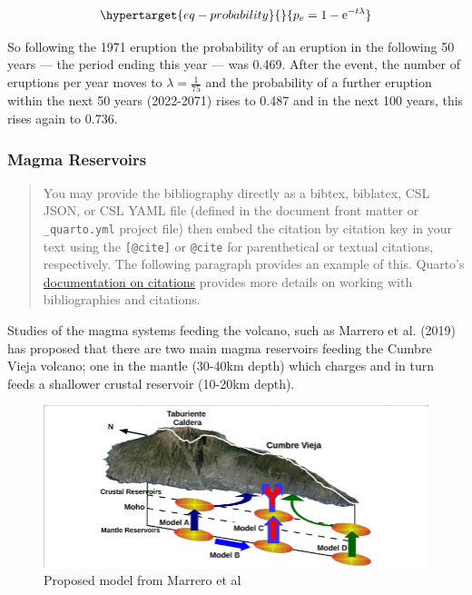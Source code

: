 \documentclass[
]{agujournal2019}
\begin{document}
\begin{equation}\protect\hypertarget{eq-probability}{}{
p_e = 1-\mathrm{e}^{-t \lambda}
}\label{eq-probability}\end{equation}

So following the 1971 eruption the probability of an eruption in the
following 50 years --- the period ending this year --- was 0.469. After
the event, the number of eruptions per year moves to
\(\lambda=\frac{1}{75}\) and the probability of a further eruption
within the next 50 years (2022-2071) rises to 0.487 and in the next 100
years, this rises again to 0.736.

\hypertarget{magma-reservoirs}{%
\subsubsection{Magma Reservoirs}\label{magma-reservoirs}}

\begin{quote}
You may provide the bibliography directly as a bibtex, biblatex, CSL
JSON, or CSL YAML file (defined in the document front matter or
\texttt{\_quarto.yml} project file) then embed the citation by citation
key in your text using the \texttt{{[}@cite{]}} or \texttt{@cite} for
parenthetical or textual citations, respectively. The following
paragraph provides an example of this. Quarto's
\href{https://quarto.org/docs/authoring/footnotes-and-citations.html}{documentation
on citations} provides more details on working with bibliographies and
citations.
\end{quote}

Studies of the magma systems feeding the volcano, such as Marrero et al.
(2019) has proposed that there are two main magma reservoirs feeding the
Cumbre Vieja volcano; one in the mantle (30-40km depth) which charges
and in turn feeds a shallower crustal reservoir (10-20km depth).

\begin{figure}

{\centering \includegraphics[width=1\textwidth,height=\textheight]{images/reservoirs.png}

}

\caption{\label{fig-reservoirs}Proposed model from Marrero et al}

\end{figure}
\end{document}

